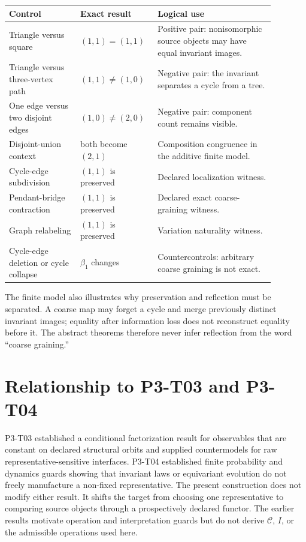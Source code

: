 \documentclass[11pt]{article}
\begin{document}
\begin{center}
\begin{tabular}{>{\raggedright\arraybackslash}p{0.25\linewidth}
                >{\raggedright\arraybackslash}p{0.22\linewidth}
                >{\raggedright\arraybackslash}p{0.41\linewidth}}
\toprule
Control & Exact result & Logical use \\
\midrule
Triangle versus square & \((1,1)=(1,1)\) & Positive pair: nonisomorphic source
objects may have equal invariant images. \\
Triangle versus three-vertex path & \((1,1)\ne(1,0)\) & Negative pair: the
invariant separates a cycle from a tree. \\
One edge versus two disjoint edges & \((1,0)\ne(2,0)\) & Negative pair:
component count remains visible. \\
Disjoint-union context & both become \((2,1)\) & Composition congruence in
the additive finite model. \\
Cycle-edge subdivision & \((1,1)\) is preserved & Declared localization
witness. \\
Pendant-bridge contraction & \((1,1)\) is preserved & Declared exact
coarse-graining witness. \\
Graph relabeling & \((1,1)\) is preserved & Variation naturality witness. \\
Cycle-edge deletion or cycle collapse & \(\beta_1\) changes & Countercontrols:
arbitrary coarse graining is not exact. \\
\bottomrule
\end{tabular}
\end{center}

The finite model also illustrates why preservation and reflection must be
separated.  A coarse map may forget a cycle and merge previously distinct
invariant images; equality after information loss does not reconstruct
equality before it.  The abstract theorems therefore never infer reflection
from the word ``coarse graining.''

\section{Relationship to P3-T03 and P3-T04}

P3-T03 established a conditional factorization result for observables that
are constant on declared structural orbits and supplied countermodels for raw
representative-sensitive interfaces.  P3-T04 established finite probability
and dynamics guards showing that invariant laws or equivariant evolution do
not freely manufacture a non-fixed representative.  The present construction
does not modify either result.  It shifts the target from choosing one
representative to comparing source objects through a prospectively declared
functor.  The earlier results motivate operation and interpretation guards but
do not derive \(\mathcal C\), \(I\), or the admissible operations used here.
\end{document}
